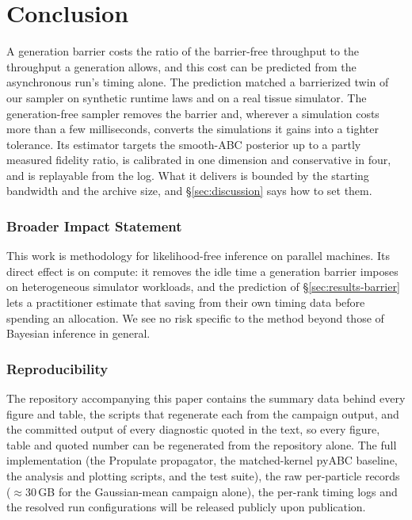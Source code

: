 \documentclass[10pt]{article}
\theoremstyle{plain}
\theoremstyle{definition}
\begin{document}
\section{Conclusion}\label{sec:conclusion}
A generation barrier costs the ratio of the barrier-free throughput to the throughput a generation allows, and this cost can be predicted from the asynchronous run's timing alone. The prediction matched a barrierized twin of our sampler on synthetic runtime laws and on a real tissue simulator. The generation-free sampler removes the barrier and, wherever a simulation costs more than a few milliseconds, converts the simulations it gains into a tighter tolerance. Its estimator targets the smooth-ABC posterior up to a partly measured fidelity ratio, is calibrated in one dimension and conservative in four, and is replayable from the log. What it delivers is bounded by the starting bandwidth and the archive size, and \S\ref{sec:discussion} says how to set them.

\subsubsection*{Broader Impact Statement}
This work is methodology for likelihood-free inference on parallel machines. Its direct effect is on compute: it removes the idle time a generation barrier imposes on heterogeneous simulator workloads, and the prediction of \S\ref{sec:results-barrier} lets a practitioner estimate that saving from their own timing data before spending an allocation. We see no risk specific to the method beyond those of Bayesian inference in general.

\subsubsection*{Reproducibility}
The repository accompanying this paper contains the summary data behind every figure and table, the scripts that regenerate each from the campaign output, and the committed output of every diagnostic quoted in the text, so every figure, table and quoted number can be regenerated from the repository alone. The full implementation (the Propulate propagator, the matched-kernel pyABC baseline, the analysis and plotting scripts, and the test suite), the raw per-particle records (${\approx}30$\,GB for the Gaussian-mean campaign alone), the per-rank timing logs and the resolved run configurations will be released publicly upon publication.

\end{document}
